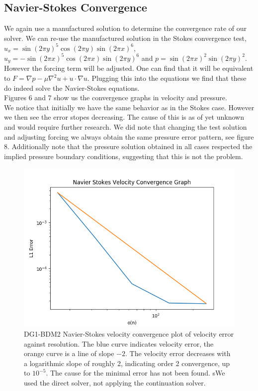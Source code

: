 \documentclass[11pt,twoside,a4paper]{article}
\begin{document}
\subsection{Navier-Stokes Convergence}

We again use a manufactured solution to determine the convergence rate of our solver.
We can re-use the manufactured solution in the Stokes convergence test, $u_x = \sin(2 \pi y)^5 \cos(2 \pi y)\sin(2 \pi x)^6$, $u_y= -\sin(2 \pi x)^5 \cos(2 \pi x) \sin(2 \pi y)^6$ and $p = \sin(2 \pi x)^2 \sin(2 \pi y)^2$.\\
However the forcing term will be adjusted. One can find that it will be equivalent to $F = \nabla p - \mu \nabla^2 u + u \cdot \nabla u$.
Plugging this into the equations we find that these do indeed solve the Navier-Stokes equations.\\
Figures 6 and 7 show us the convergence graphs in velocity and pressure.\\
We notice that initially we have the same behavior as in the Stokes case. However we then see the error stopes decreasing. The cause of this is as of yet unknown and would require further research. We did note that changing the test solution and adjusting forcing we always obtain the same pressure error pattern, see figure 8. Additionally note that the pressure solution obtained in all cases respected the implied pressure boundary conditions, suggesting that this is not the problem.

\begin{figure}
  \includegraphics[width=\linewidth]{navier_stokes_convergence_dbc0.png}
  \caption{DG1-BDM2 Navier-Stokes velocity convergence plot of velocity error against resolution.  The blue curve indicates velocity error, the orange curve is a line of slope $-2$.  The velocity error decreases with a logarithmic slope of roughly 2, indicating order 2 convergence, up to $10^{-5}$. The cause for the minimal error has not been found. sWe used the direct solver, not applying the continuation solver.}
\end{figure}
\end{document}

